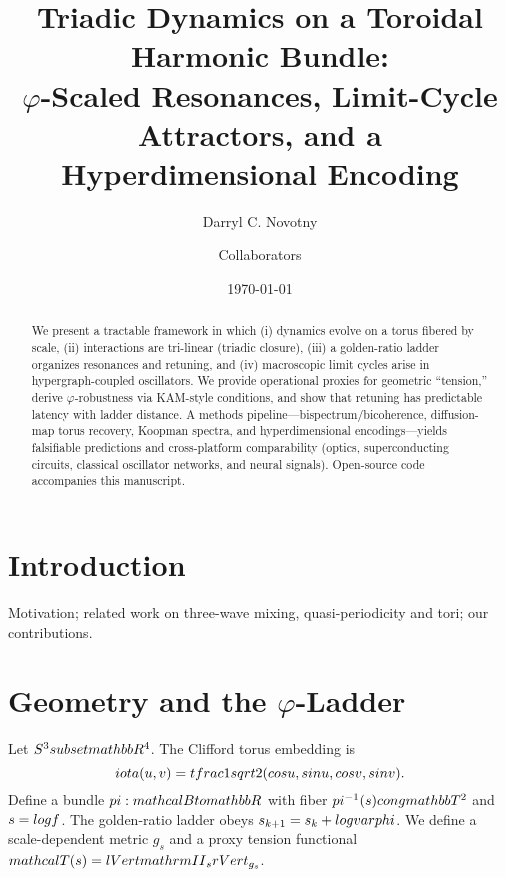 \documentclass[11pt]{article}
\title{Triadic Dynamics on a Toroidal Harmonic Bundle:\\
\large $\varphi$-Scaled Resonances, Limit-Cycle Attractors, and a Hyperdimensional Encoding}
\author{Darryl C. Novotny \and Collaborators}
\date{\today}
\begin{document}
\maketitle

\begin{abstract}
We present a tractable framework in which (i) dynamics evolve on a torus fibered by scale, (ii) interactions are tri-linear (triadic closure), (iii) a golden-ratio ladder organizes resonances and retuning, and (iv) macroscopic limit cycles arise in hypergraph-coupled oscillators. We provide operational proxies for geometric ``tension,'' derive $\varphi$-robustness via KAM-style conditions, and show that retuning has predictable latency with ladder distance. A methods pipeline---bispectrum/bicoherence, diffusion-map torus recovery, Koopman spectra, and hyperdimensional encodings---yields falsifiable predictions and cross-platform comparability (optics, superconducting circuits, classical oscillator networks, and neural signals). Open-source code accompanies this manuscript.
\end{abstract}

\section{Introduction}
Motivation; related work on three-wave mixing, quasi-periodicity and tori; our contributions.

\section{Geometry and the $\varphi$-Ladder}
Let $S^3\\subset\\mathbb{R}^4$. The Clifford torus embedding is
\[
\\iota(u,v)=\\tfrac{1}{\\sqrt{2}}(\\cos u,\\sin u,\\cos v,\\sin v).
\]
Define a bundle $\\pi:\\mathcal{B}\\to\\mathbb{R}$ with fiber $\\pi^{-1}(s)\\cong \\mathbb{T}^2$ and $s=\\log f$. The golden-ratio ladder obeys $s_{k+1}=s_k+\\log\\varphi$. We define a scale-dependent metric $g_s$ and a proxy tension functional $\\mathcal{T}(s)=\\lVert\\mathrm{II}_s\\rVert_{g_s}$.
\end{document}
